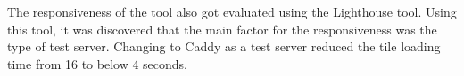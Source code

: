 The responsiveness of the tool also got evaluated using the Lighthouse tool. Using this tool, it was discovered that the main factor for the responsiveness was the type of test server. Changing to Caddy as a test server reduced the tile loading time from 16 to below 4 seconds.

